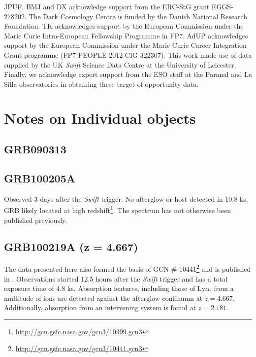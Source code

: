 \documentclass[iop, twocolappendix, numberedappendix, tighten, appendixfloats]{emulateapj}
\newcommand{\lya}{Ly$\alpha$}
\begin{document}
	\begin{acknowledgements}
		JPUF, BMJ and DX acknowledge support from the ERC-StG grant EGGS-278202.  The
		Dark Cosmology Centre is funded by the Danish National Research Foundation.  TK
		acknowledges support by the European Commission under the Marie Curie
		Intra-European Fellowship Programme in FP7.  AdUP acknowledges support by the
		European Commission under the Marie Curie Career Integration Grant programme
		(FP7-PEOPLE-2012-CIG 322307).  This work made use of data supplied by the UK
		{\it Swift} Science Data Centre at the University of Leicester.  Finally, we
		acknowledge expert support from the ESO staff at the Paranal and La Silla
		observatories in obtaining these target of opportunity data.
		
	\end{acknowledgements}
	
	\def\aj{AJ}
	\def\araa{ARA\&A}
	\def\apj{ApJ}
	\def\apjl{ApJL}
	\def\apjs{ApJS}
	\def\apss{Ap\&SS}
	\def\aap{A\&A}
	\def\aapr{A\&A~Rev.}
	\def\aaps{A\&AS}
	\def\mnras{MNRAS}
	\def\nat{Nature}
	\def\pasp{PASP}
	\def\aplett{Astrophys.~Lett.}
	
	
	
	
	
	\newpage
	\appendix

	\section{Notes on Individual objects}
	
	\subsection{GRB090313}
	
	\subsection{GRB100205A}
	Observed 3 days after the \textit{Swift} trigger. No afterglow or host detected
	in 10.8 ks. GRB likely located at high
	redshift\footnote{\url{http://gcn.gsfc.nasa.gov/gcn3/10399.gcn3}}. The spectrum
	has not otherwise been published previously.
	
	\subsection{GRB100219A (z = 4.667)}
	The data presented here also formed the basis of GCN \#
	10441\footnote{\url{http://gcn.gsfc.nasa.gov/gcn3/10441.gcn3}} and is published
	in \citet{Thone2013}. Observations started 12.5 hours after the \textit{Swift}
	trigger and has a total exposure time of 4.8 ks. Absorption features, including
	those of \lya, from a multitude of ions are detected against the afterglow
	continuum at $z = 4.667$. Additionally, absorption from an intervening system
	is found at $z = 2.181$.
	
\end{document}
